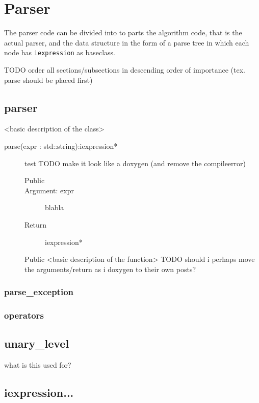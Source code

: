 \documentclass[a4paper,11pt]{kth-mag}
\begin{document}
\section{Parser}
The parser code can be divided into to parts the algorithm code, that is the actual parser, and the data structure in the form of a parse tree in which each node has \texttt{iexpression} as baseclass.

TODO order all sections/subsections in descending order of importance (tex. parse should be placed first)
\subsection{parser}
<basic description of the class>
\begin{description}
    \item[parse(expr : std::string):iexpression*] test
        TODO make it look like a doxygen (and remove the compileerror)
        \begin{description}
            \item[Public]
            \item[Argument: expr] blabla
            \item[Return] iexpression*

        \end{description}
        Public <basic description of the function> TODO should i perhaps move the arguments/return as i doxygen to their own posts?
\end{description}
\subsubsection{parse\_exception}
\subsubsection{operators}

\subsection{unary\_level}
what is this used for?
\subsection{iexpression...}
\end{document}
